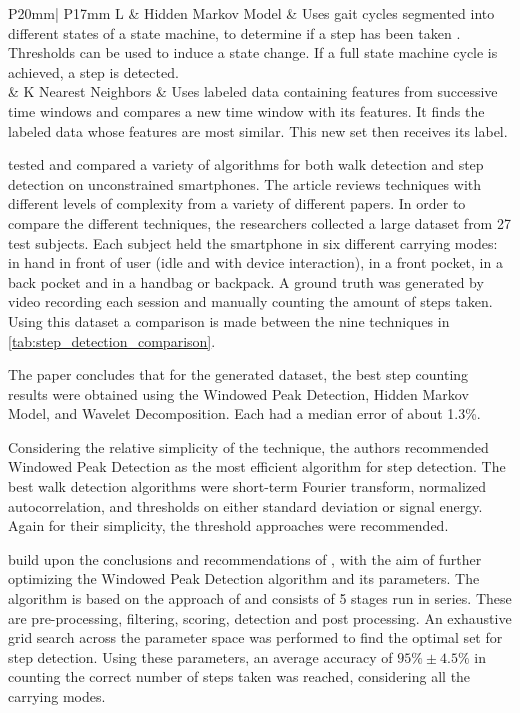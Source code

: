 \begin{table}[]
\begin{tabularx}{\linewidth}{ P{20mm}| P{17mm} L}
		 & Hidden Markov Model & Uses gait cycles segmented into different states of a state machine, to determine if a step has been taken \cite{Ren2016a}. Thresholds can be used to induce a state change. If a full state machine cycle is achieved, a step is detected.\\ 
		& K Nearest Neighbors & Uses labeled data containing features from successive time windows and compares a new time window with its features. It finds the labeled data whose features are most similar. This new set then receives its label. \\
		\bottomrule
	\end{tabularx}
	\caption{Overview of different step detection methods using inertial sensors.}
	\label{tab:step_detection_comparison}
\end{table}

\citet{Brajdic2013} tested and compared a variety of algorithms for both walk detection and step detection on unconstrained smartphones. The article reviews techniques with different levels of complexity from a variety of different papers. In order to compare the different techniques, the researchers collected a large dataset from 27 test subjects. Each subject held the smartphone in six different carrying modes: in hand in front of user (idle and with device interaction), in a front pocket, in a back pocket and in a handbag or backpack. A ground truth was generated by video recording each session and manually counting the amount of steps taken. Using this dataset a comparison is made between the nine techniques in \cref{tab:step_detection_comparison}.\par 
The paper concludes that for the generated dataset, the best step counting results were obtained using the Windowed Peak Detection, Hidden Markov Model, and Wavelet Decomposition. Each had a median error of about 1.3\%.\par 
Considering the relative simplicity of the technique, the authors recommended Windowed Peak Detection as the most efficient algorithm for step detection. The best walk detection algorithms were short-term Fourier transform, normalized autocorrelation, and thresholds on either standard deviation or signal energy. Again for their simplicity, the threshold approaches were recommended. \par
\citet{Salvi2018} build upon the conclusions and recommendations of \citet{Brajdic2013}, with the aim of further optimizing the Windowed Peak Detection algorithm and its parameters. The algorithm is based on the approach of \citet{Palshikar2009} and consists of 5 stages run in series. These are pre-processing, filtering, scoring, detection and post processing. An exhaustive grid search across the parameter space was performed to find the optimal set for step detection. Using these parameters, an average accuracy of $95\% \pm 4.5\%$ in counting the correct number of steps taken was reached, considering all the carrying modes.

